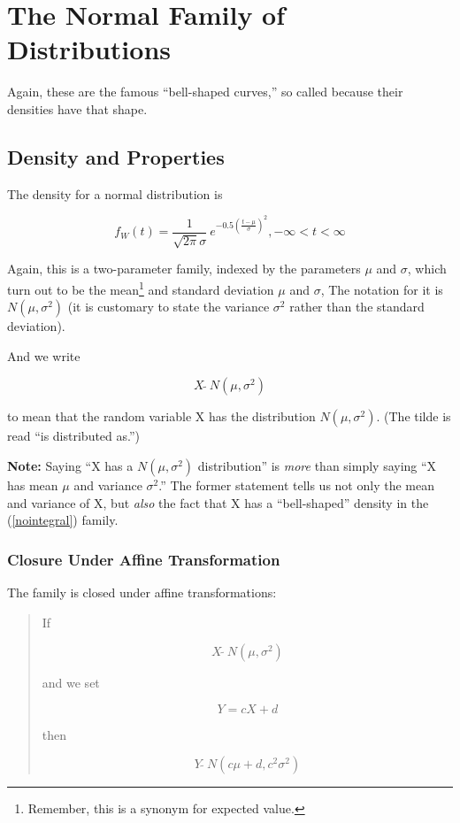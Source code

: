 \chapter{The Normal Family of Distributions} 
\label{chap:normal}

Again, these are the famous ``bell-shaped curves,'' so called because
their densities have that shape.

\section{Density and Properties}

The density for a normal distribution is

\begin{equation}
\label{nointegral}
f_W(t) = \frac{1}{\sqrt{2\pi} \sigma} ~ e^{- 0.5 \left (\frac{t-\mu}{\sigma}
\right )^2}, -\infty < t < \infty
\end{equation}

Again, this is a two-parameter family, indexed by the parameters $\mu$
and $\sigma$, which turn out to be the mean\footnote{Remember, this is a
synonym for expected value.} and standard deviation  $\mu$ and $\sigma$,
The notation for it is $N(\mu,\sigma^2)$ (it is customary to state
the variance $\sigma^2$ rather than the standard deviation).

And we write 

\begin{equation}
X ~ \widetilde{ } ~ N(\mu,\sigma^2)
\end{equation}

to mean that the random variable X has the distribution $N(\mu,\sigma^2)$.
(The tilde is read ``is distributed as.'')


{\bf Note:} Saying ``X has a $N(\mu,\sigma^2)$ distribution'' is {\it
more} than simply saying ``X has mean $\mu$ and variance $\sigma^2$.''
The former statement tells us not only the mean and variance of X, but
{\it also} the fact that X has a ``bell-shaped'' density in the
(\ref{nointegral}) family.

\subsection{Closure Under Affine Transformation}
\label{affine}

The family is closed under affine transformations:

\begin{quote}

If 

\begin{equation}
X ~ \widetilde{} ~ N(\mu,\sigma^2)
\end{equation}

and we set 

\begin{equation}
Y = cX + d 
\end{equation}

then

\begin{equation}
Y ~ \widetilde{} ~ N(c\mu+d,c^2\sigma^2)
\end{equation}

\end{quote}

